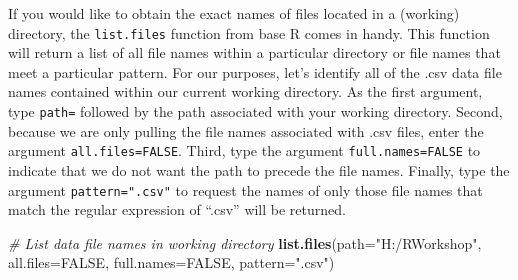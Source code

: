 \documentclass[]{book}
\newenvironment{Shaded}{\begin{snugshade}}{\end{snugshade}}
\newcommand{\KeywordTok}[1]{\textcolor[rgb]{0.13,0.29,0.53}{\textbf{#1}}}
\newcommand{\DataTypeTok}[1]{\textcolor[rgb]{0.13,0.29,0.53}{#1}}
\newcommand{\StringTok}[1]{\textcolor[rgb]{0.31,0.60,0.02}{#1}}
\newcommand{\CommentTok}[1]{\textcolor[rgb]{0.56,0.35,0.01}{\textit{#1}}}
\newcommand{\OtherTok}[1]{\textcolor[rgb]{0.56,0.35,0.01}{#1}}
\newcommand{\NormalTok}[1]{#1}
\begin{document}
If you would like to obtain the exact names of files located in a
(working) directory, the \texttt{list.files} function from base R comes
in handy. This function will return a list of all file names within a
particular directory or file names that meet a particular pattern. For
our purposes, let's identify all of the .csv data file names contained
within our current working directory. As the first argument, type
\texttt{path=} followed by the path associated with your working
directory. Second, because we are only pulling the file names associated
with .csv files, enter the argument \texttt{all.files=FALSE}. Third,
type the argument \texttt{full.names=FALSE} to indicate that we do not
want the path to precede the file names. Finally, type the argument
\texttt{pattern=".csv"} to request the names of only those file names
that match the regular expression of ``.csv'' will be returned.

\begin{Shaded}
\begin{Highlighting}[]
\CommentTok{# List data file names in working directory}
\KeywordTok{list.files}\NormalTok{(}\DataTypeTok{path=}\StringTok{"H:/RWorkshop"}\NormalTok{, }
           \DataTypeTok{all.files=}\OtherTok{FALSE}\NormalTok{, }
           \DataTypeTok{full.names=}\OtherTok{FALSE}\NormalTok{, }
           \DataTypeTok{pattern=}\StringTok{".csv"}\NormalTok{)}
\end{Highlighting}
\end{Shaded}
\end{document}
